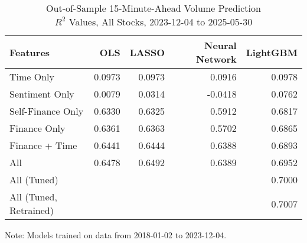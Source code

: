 \begin{table}[H]
\caption*{
{\large Out-of-Sample 15-Minute-Ahead Volume Prediction} \\
{\small $R^2$ Values, All Stocks, 2023-12-04 to 2025-05-30}
} 

\fontsize{12.0pt}{14.4pt}\selectfont

\begin{tabular*}{\linewidth}{@{\extracolsep{\fill}}lrrrr}
\toprule
Features & OLS & LASSO & Neural Network & LightGBM \\ 
\midrule\addlinespace[2.5pt]
Time Only & 0.0973 & 0.0973 & 0.0916 & 0.0978 \\
Sentiment Only & 0.0079 & 0.0314 & -0.0418 & 0.0762 \\
Self-Finance Only & 0.6330 & 0.6325 & 0.5912 & 0.6817 \\
Finance Only & 0.6361 & 0.6363 & 0.5702 & 0.6865 \\
Finance + Time & 0.6441 & 0.6444 & 0.6388 & 0.6893 \\
All & 0.6478 & 0.6492 & 0.6389 & 0.6952 \\
All (Tuned) &  &  &  & 0.7000 \\
All (Tuned, Retrained) &  &  &  & 0.7007 \\
\bottomrule
\end{tabular*}
\begin{minipage}{\linewidth}
Note: Models trained on data from 2018-01-02 to 2023-12-04.\\
\end{minipage}
\end{table}
